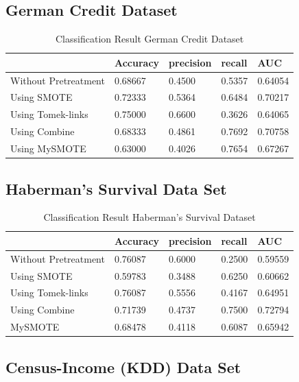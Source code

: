 \subsection{German Credit Dataset}

\begin{table}[H]
    \caption{Classification Result German Credit Dataset}
    \centering
    \begin{tabular}{|l|l|l|l|l|}
    \hline
         & Accuracy & precision & recall & AUC \\ \hline
        Without Pretreatment & 0.68667 & 0.4500 & 0.5357 & 0.64054 \\ \hline
        Using SMOTE & 0.72333 & 0.5364 & 0.6484 & 0.70217 \\ \hline
        Using Tomek-links & 0.75000 & 0.6600 & 0.3626 & 0.64065 \\ \hline
        Using Combine & 0.68333 & 0.4861 & 0.7692 & 0.70758 \\ \hline
        Using MySMOTE & 0.63000 & 0.4026 & 0.7654 & 0.67267 \\ \hline
    \end{tabular}
\end{table}


\subsection{Haberman's Survival Data Set}

\begin{table}[H]
    \caption{Classification Result Haberman's Survival Dataset}
    \centering
    \begin{tabular}{|l|l|l|l|l|}
    \hline
         & Accuracy & precision & recall & AUC \\ \hline
        Without Pretreatment & 0.76087 & 0.6000 & 0.2500 & 0.59559 \\ \hline
        Using SMOTE & 0.59783 & 0.3488 & 0.6250 & 0.60662 \\ \hline
        Using Tomek-links & 0.76087 & 0.5556 & 0.4167 & 0.64951 \\ \hline
        Using Combine & 0.71739 & 0.4737 & 0.7500 & 0.72794 \\ \hline
        MySMOTE & 0.68478 & 0.4118 & 0.6087 & 0.65942 \\ \hline
    \end{tabular}
\end{table}

\subsection{Census-Income (KDD) Data Set}

